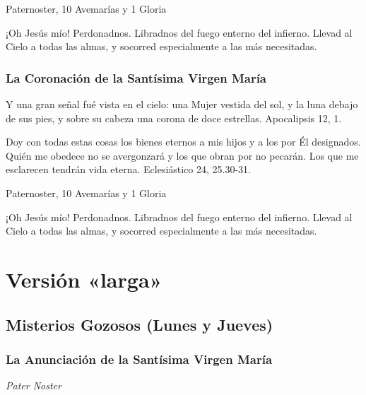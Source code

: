 \documentclass[a4paper,11pt, oneside]{report}
\begin{document}
         Paternoster, 10 Avemarías y 1 Gloria
        
        \medskip
        ¡Oh Jesús mío! Perdonadnos. Libradnos del fuego enterno del infierno. Llevad al Cielo a todas las almas, y socorred especialmente a las más necesitadas.

      \subsection*{La Coronación de la Santísima Virgen María}
        Y una gran señal fué vista en el cielo: una Mujer vestida del sol, y la luna debajo de sus pies, y sobre su cabeza una corona de doce estrellas.
        Apocalipsis 12, 1.

        \medskip
        Doy con todas estas cosas los bienes eternos a mis hijos y a los por Él designados. Quién me obedece no se avergonzará y los que obran por
        no pecarán. Los que me esclarecen tendrán vida eterna. Eclesiástico 24, 25.30-31.

         Paternoster, 10 Avemarías y 1 Gloria
        
        \medskip
        ¡Oh Jesús mío! Perdonadnos. Libradnos del fuego enterno del infierno. Llevad al Cielo a todas las almas, y socorred especialmente a las más necesitadas.

  \chapter*{Versión «larga»}
  
    \section*{Misterios Gozosos (Lunes y Jueves)}
    \bigskip
      \subsection*{La Anunciación de la Santísima Virgen María}

        \textit{Pater Noster}
\end{document}

